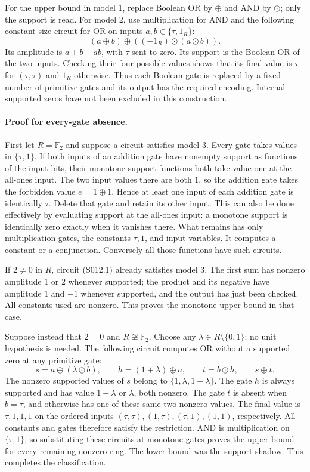 For the upper bound in model 1, replace Boolean OR by $\oplus$ and AND
by $\odot$; only the support is read. For model 2, use multiplication
for AND and the following constant-size circuit for OR on inputs
$a,b\in\{\tau,1_R\}$:
\[
 (a\oplus b)\oplus((-1_R)\odot(a\odot b)).             \tag{S012.1}
\]
Its amplitude is $a+b-ab$, with $\tau$ sent to zero. Its support is
the Boolean OR of the two inputs. Checking their four possible values
shows that its final value is $\tau$ for $(\tau,\tau)$ and $1_R$
otherwise. Thus each Boolean gate is replaced by a fixed number of
primitive gates and its output has the required encoding. Internal
supported zeros have not been excluded in this construction.

\paragraph{Proof for every-gate absence.}
First let $R=\mathbb F_2$ and suppose a circuit satisfies model 3.
Every gate takes values in $\{\tau,1\}$. If both inputs of an addition
gate have nonempty support as functions of the input bits, their
monotone support functions both take value one at the all-ones input.
The two input values there are both $1$, so the addition gate takes
the forbidden value $e=1\oplus1$. Hence at least one input of each
addition gate is identically $\tau$. Delete that gate and retain its
other input. This can also be done effectively by evaluating support
at the all-ones input: a monotone support is identically zero exactly
when it vanishes there. What remains has only multiplication gates,
the constants $\tau,1$, and input variables. It computes a constant
or a conjunction. Conversely all those functions have such circuits.

If $2\ne0$ in $R$, circuit (S012.1) already satisfies model 3.
The first sum has nonzero amplitude $1$ or $2$ whenever supported;
the product and its negative have amplitude $1$ and $-1$ whenever
supported, and the output has just been checked. All constants used
are nonzero. This proves the monotone upper bound in that case.

Suppose instead that $2=0$ and $R\not\cong\mathbb F_2$.
Choose any $\lambda\in R\setminus\{0,1\}$; no unit hypothesis is
needed. The following circuit computes OR without a supported zero
at any primitive gate:
\[
 s=a\oplus(\lambda\odot b),\qquad
 h=(1+\lambda)\oplus a,\qquad
 t=b\odot h,\qquad s\oplus t.                         \tag{S012.2}
\]
The nonzero supported values of $s$ belong to
$\{1,\lambda,1+\lambda\}$. The gate $h$ is always supported and has
value $1+\lambda$ or $\lambda$, both nonzero. The gate $t$ is absent
when $b=\tau$, and otherwise has one of these same two nonzero values.
The final value is $\tau,1,1,1$ on the ordered inputs
$(\tau,\tau),(1,\tau),(\tau,1),(1,1)$, respectively. All constants
and gates therefore satisfy the restriction. AND is multiplication
on $\{\tau,1\}$, so substituting these circuits at monotone gates
proves the upper bound for every remaining nonzero ring. The lower
bound was the support shadow. This completes the classification.

